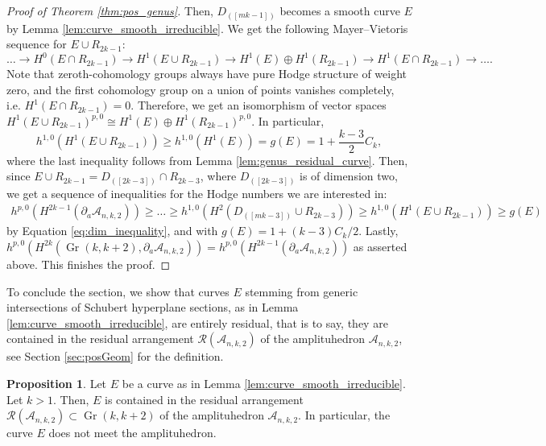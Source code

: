 \documentclass[12pt]{extarticle}
\theoremstyle{definition}
\theoremstyle{theorem}
\newtheorem{proposition}[definition]{Proposition}
\theoremstyle{remark}
\numberwithin{equation}{section}
\newcommand{\grk}{\operatorname{Gr}(k,k+2)}
\newcommand{\aA}{\mathcal{A}}
\newcommand{\odd}[1]{([#1])}
\begin{document}
\begin{proof}[Proof of Theorem \ref{thm:pos_genus}]
    Then, $D_{\odd{mk-1}}$ becomes a smooth curve $E$ by Lemma \ref{lem:curve_smooth_irreducible}.
    We get the following Mayer--Vietoris sequence for $E\cup R_{2k-1}$:
    \[
    \ldots\to H^0(E\cap R_{2k-1})\to H^1(E\cup R_{2k-1})\to H^1(E)\oplus H^1(R_{2k-1})\to H^1(E\cap R_{2k-1}) \to\ldots.
    \]
    Note that zeroth-cohomology groups always have pure Hodge structure of weight zero, and the first cohomology group on a union of points vanishes completely, i.e. $H^1(E\cap R_{2k-1})=0$.
    Therefore, we get an isomorphism of vector spaces $H^1(E\cup R_{2k-1})^{p,0}\cong H^1(E)\oplus H^1(R_{2k-1})^{p,0}$. In particular,
    \[
    h^{1,0}(H^1(E\cup R_{2k-1}))\geq h^{1,0}(H^1(E))=g(E)=1+\frac{k-3}{2}C_k,
    \]
    where the last inequality follows from Lemma \ref{lem:genus_residual_curve}.
    Then, since $E\cup R_{2k-1}=D_{\odd{2k-3}}\cap R_{2k-3}$, where $D_{\odd{2k-3}}$ is of dimension two, we get a sequence of inequalities for the Hodge numbers we are interested in:
    \begin{align}
    h^{p,0}(H^{2k-1}(\partial_a\aA_{n,k,2})) \geq \ldots \geq h^{1,0}(H^2(D_{\odd{mk-3}}\cup R_{2k-3})) \geq h^{1,0}(H^1(E\cup R_{2k-1}))\geq g(E)
    \end{align}
    by Equation \eqref{eq:dim_inequality}, and with $g(E)=1+(k-3)C_k/2$.
    Lastly, $h^{p,0}(H^{2k}(\grk,\partial_a\aA_{n,k,2})) = h^{p,0}(H^{2k-1}(\partial_a\aA_{n,k,2}))$ as asserted above. This finishes the proof.
\end{proof}

To conclude the section, we show that curves $E$ stemming from generic intersections of Schubert hyperplane sections, as in Lemma \ref{lem:curve_smooth_irreducible}, are entirely residual, that is to say, they are contained in the residual arrangement $\mathcal{R}(\aA_{n,k,2})$ of the amplituhedron $\aA_{n,k,2}$, see Section \ref{sec:posGeom} for the definition. 

\begin{proposition}\label{prop:residual_curves}
    Let $E$ be a curve as in Lemma \ref{lem:curve_smooth_irreducible}.
    Let $k>1$.
    Then, $E$ is contained in the residual arrangement $\mathcal{R}(\aA_{n,k,2})\subset \grk$ of the amplituhedron $\aA_{n,k,2}$.
    In particular, the curve $E$ does not meet the amplituhedron.
\end{proposition}
\end{document}
